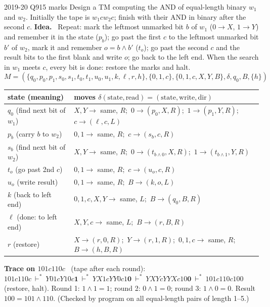 \documentclass[10.5pt,a4paper]{article}
\newcommand{\ansh}[1]{\textbf{\color{exborder}#1}\ }
\begin{document}
\begin{examq}{2019-20 Q9}{15 marks}
Design a TM computing the AND of equal-length binary $w_1$ and $w_2$. Initially the tape is $w_1cw_2c$; finish with their AND in binary after
the second $c$.
\tcblower
\ansh{Idea.} Repeat: mark the leftmost unmarked bit $b$ of $w_1$ ($0\to X$, $1\to Y$) and remember it in the state ($p_b$); go past the first
$c$ to the leftmost unmarked bit $b'$ of $w_2$, mark it and remember $o=b\wedge b'$ ($t_o$); go past the second $c$ and the result bits to the
first blank and write $o$; go back to the left end. When the search in $w_1$ meets $c$, every bit is done: restore the marks and halt.
\[M=(\{q_0,p_0,p_1,s_0,s_1,t_0,t_1,u_0,u_1,k,\ell,r,h\},\{0,1,c\},\{0,1,c,X,Y,B\},\delta,q_0,B,\{h\})\]
\begin{center}\small
\begin{tabular}{@{}l|l@{}}
state (meaning) & moves $\delta(\text{state},\text{read})=(\text{state},\text{write},\text{dir})$\\\hline
$q_0$ (find next bit of $w_1$) & $X,Y\to$ same, $R$;\ $0\to(p_0,X,R)$;\ $1\to(p_1,Y,R)$;\ $c\to(\ell,c,L)$\\
$p_b$ (carry $b$ to $w_2$) & $0,1\to$ same, $R$;\ $c\to(s_b,c,R)$\\
$s_b$ (find next bit of $w_2$) & $X,Y\to$ same, $R$;\ $0\to(t_{b\wedge0},X,R)$;\ $1\to(t_{b\wedge1},Y,R)$\\
$t_o$ (go past 2nd $c$) & $0,1\to$ same, $R$;\ $c\to(u_o,c,R)$\\
$u_o$ (write result) & $0,1\to$ same, $R$;\ $B\to(k,o,L)$\\
$k$ (back to left end) & $0,1,c,X,Y\to$ same, $L$;\ $B\to(q_0,B,R)$\\
$\ell$ (done: to left end) & $X,Y,c\to$ same, $L$;\ $B\to(r,B,R)$\\
$r$ (restore) & $X\to(r,0,R)$;\ $Y\to(r,1,R)$;\ $0,1,c\to$ same, $R$;\ $B\to(h,B,R)$
\end{tabular}
\end{center}
\ansh{Trace on $101c110c$} (tape after each round): \quad
$101c110c\ \vdash^*\ Y01cY10c\mathbf1\ \vdash^*\ YX1cYY0c1\mathbf0\ \vdash^*\ YXYcYYXc10\mathbf0\ \vdash^*\ 101c110c100$ (restore, halt).
Round 1: $1\wedge1=1$; round 2: $0\wedge1=0$; round 3: $1\wedge0=0$. Result $100=101\wedge110$. (Checked by program on all equal-length
pairs of length 1--5.)
\end{examq}
\end{document}
